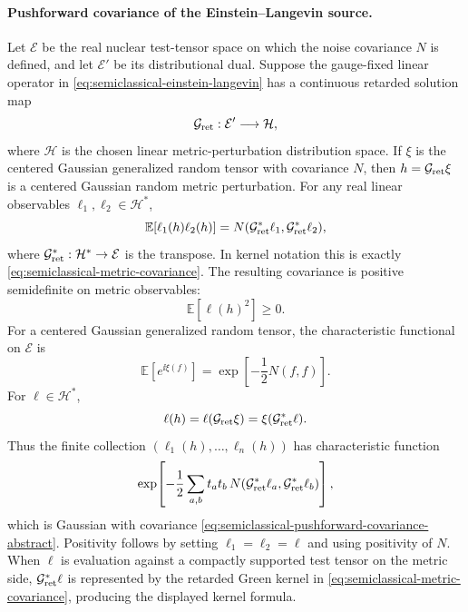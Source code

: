 \paragraph{Pushforward covariance of the Einstein--Langevin source.}
Let \(\mathcal E\) be the real nuclear test-tensor space on which the noise
covariance \(N\) is defined, and let \(\mathcal E'\) be its distributional
dual.  Suppose the gauge-fixed linear operator in
\eqref{eq:semiclassical-einstein-langevin} has a continuous retarded
solution map
\begin{equation}
  \mathcal G_{\rm ret}:\mathcal E'\longrightarrow \mathcal H ,
  \label{eq:semiclassical-retarded-solution-map}
\end{equation}
where \(\mathcal H\) is the chosen linear metric-perturbation distribution
space.  If \(\xi\) is the centered Gaussian generalized random tensor with
covariance \(N\), then \(h=\mathcal G_{\rm ret}\xi\) is a centered Gaussian
random metric perturbation.  For any real linear observables
\(\ell_1,\ell_2\in\mathcal H^*\),
\begin{equation}
  \mathbb E[\ell_1(h)\ell_2(h)]
  =
  N(\mathcal G_{\rm ret}^*\ell_1,\mathcal G_{\rm ret}^*\ell_2),
  \label{eq:semiclassical-pushforward-covariance-abstract}
\end{equation}
where \(\mathcal G_{\rm ret}^*:\mathcal H^*\to\mathcal E\) is the transpose.
In kernel notation this is exactly
\eqref{eq:semiclassical-metric-covariance}.  The resulting covariance is
positive semidefinite on metric observables:
\begin{equation}
  \mathbb E[\ell(h)^2]\ge0 .
  \label{eq:semiclassical-metric-covariance-positivity}
\end{equation}
For a centered Gaussian generalized random tensor, the characteristic
functional on \(\mathcal E\) is
\begin{equation}
  \mathbb E[e^{\ii\xi(f)}]
  =
  \exp\!\left[-\frac12N(f,f)\right].
  \label{eq:semiclassical-noise-characteristic-functional}
\end{equation}
For \(\ell\in\mathcal H^*\),
\begin{equation}
  \ell(h)=\ell(\mathcal G_{\rm ret}\xi)
  =
  \xi(\mathcal G_{\rm ret}^*\ell).
  \label{eq:semiclassical-observable-pullback}
\end{equation}
Thus the finite collection
\((\ell_1(h),\ldots,\ell_n(h))\) has characteristic function
\begin{equation}
  \exp\!\left[
    -\frac12
    \sum_{a,b}t_at_b\,
    N(\mathcal G_{\rm ret}^*\ell_a,\mathcal G_{\rm ret}^*\ell_b)
  \right],
  \label{eq:semiclassical-pushforward-characteristic-function}
\end{equation}
which is Gaussian with covariance
\eqref{eq:semiclassical-pushforward-covariance-abstract}.  Positivity
follows by setting \(\ell_1=\ell_2=\ell\) and using positivity of \(N\).
When \(\ell\) is evaluation against a compactly supported test tensor on the
metric side, \(\mathcal G_{\rm ret}^*\ell\) is represented by the retarded
Green kernel in \eqref{eq:semiclassical-metric-covariance}, producing the
displayed kernel formula.

